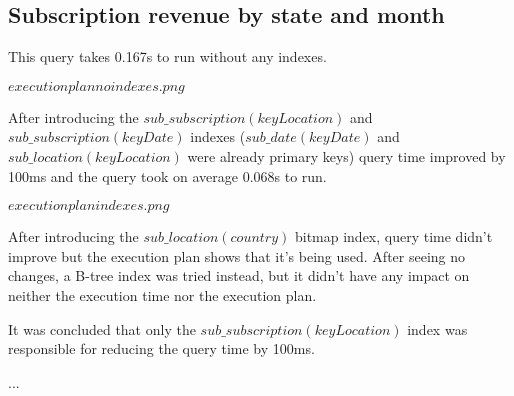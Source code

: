 \subsection*{Subscription revenue by state and month} 
This query takes 0.167s to run without any indexes.

$execution plan no indexes.png$

After introducing the $sub\_subscription(keyLocation)$ and $sub\_subscription(keyDate)$ indexes ($sub\_date(keyDate)$ and $sub\_location(keyLocation)$ were already primary keys) query time improved by 100ms and the query took on average 0.068s to run.

$execution plan indexes.png$

After introducing the $sub\_location(country)$ bitmap index, query time didn't improve but the execution plan shows that it's being used. After seeing no changes, a B-tree index was tried instead, but it didn't have any impact on neither the execution time nor the execution plan.

It was concluded that only the $sub\_subscription(keyLocation)$ index was responsible for reducing the query time by 100ms.

\noindent ...
